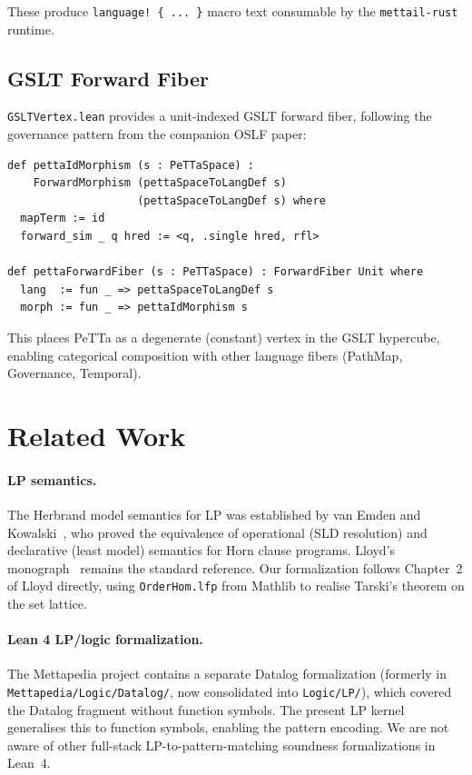 \documentclass[]{article}
\newcommand{\code}[1]{\texttt{#1}}
\newcommand{\PeTTa}{\textup{PeTTa}}
\newcommand{\OSLF}{\textup{OSLF}}
\begin{document}
These produce \code{language! \{ ... \}} macro text consumable by the
\code{mettail-rust} runtime.

\subsection{GSLT Forward Fiber}

\code{GSLTVertex.lean} provides a unit-indexed GSLT forward fiber, following the
governance pattern from the companion \OSLF{} paper:

\begin{lstlisting}[language=lean]
def pettaIdMorphism (s : PeTTaSpace) :
    ForwardMorphism (pettaSpaceToLangDef s)
                    (pettaSpaceToLangDef s) where
  mapTerm := id
  forward_sim _ q hred := <q, .single hred, rfl>

def pettaForwardFiber (s : PeTTaSpace) : ForwardFiber Unit where
  lang  := fun _ => pettaSpaceToLangDef s
  morph := fun _ => pettaIdMorphism s
\end{lstlisting}

This places \PeTTa{} as a degenerate (constant) vertex in the GSLT hypercube,
enabling categorical composition with other language fibers (PathMap, Governance,
Temporal).

\section{Related Work}
\label{sec:related}

\paragraph{LP semantics.}
The Herbrand model semantics for LP was established by van Emden and
Kowalski~\cite{vanEmdenKowalski1976}, who proved the equivalence of operational
(SLD resolution) and declarative (least model) semantics for Horn clause programs.
Lloyd's monograph~\cite{Lloyd1987} remains the standard reference.  Our
formalization follows Chapter~2 of Lloyd directly, using \code{OrderHom.lfp}
from Mathlib to realise Tarski's theorem on the set lattice.

\paragraph{Lean 4 LP/logic formalization.}
The Mettapedia project contains a separate Datalog formalization
(formerly in \code{Mettapedia/Logic/Datalog/}, now consolidated into \code{Logic/LP/}),
which covered the Datalog fragment without function symbols.  The present
LP kernel generalises this to function symbols, enabling the pattern encoding.
We are not aware of other full-stack LP-to-pattern-matching soundness formalizations
in Lean~4.
\end{document}
